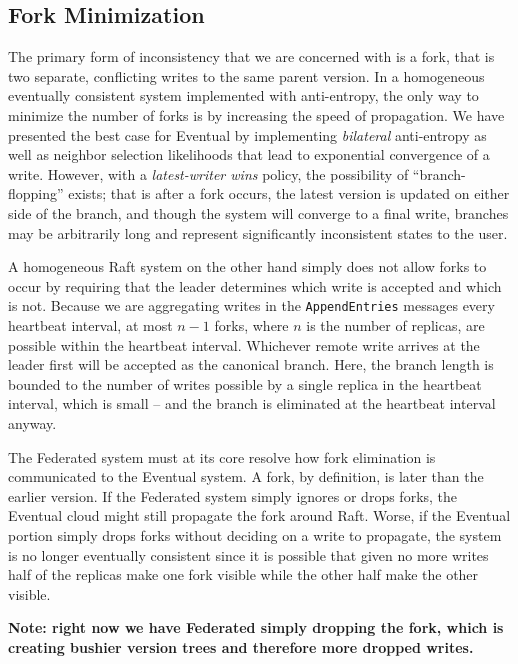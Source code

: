 \documentclass[10pt,conference,letterpaper]{IEEEtran}
\newcommand{\note}[1]{\textcolor{blue}{[#1]}}
\begin{document}

\subsection{Fork Minimization}

The primary form of inconsistency that we are concerned with is a fork, that is two separate, conflicting writes to the same parent version. In a homogeneous eventually consistent system implemented with anti-entropy, the only way to minimize the number of forks is by increasing the speed of propagation. We have presented the best case for Eventual by implementing \textit{bilateral} anti-entropy as well as neighbor selection likelihoods that lead to exponential convergence of a write. However, with a \textit{latest-writer wins} policy, the possibility of ``branch-flopping'' exists; that is after a fork occurs, the latest version is updated on either side of the branch, and though the system will converge to a final write, branches may be arbitrarily long and represent significantly inconsistent states to the user.

A homogeneous Raft system on the other hand simply does not allow forks to occur by requiring that the leader determines which write is accepted and which is not. Because we are aggregating writes in the \texttt{AppendEntries} messages every heartbeat interval, at most $n-1$ forks, where $n$ is the number of replicas, are possible within the heartbeat interval. Whichever remote write arrives at the leader first will be accepted as the canonical branch. Here, the branch length is bounded to the number of writes possible by a single replica in the heartbeat interval, which is small -- and the branch is eliminated at the heartbeat interval anyway.

The Federated system must at its core resolve how fork elimination is communicated to the Eventual system. A fork, by definition, is later than the earlier version. If the Federated system simply ignores or drops forks, the Eventual cloud might still propagate the fork around Raft. Worse, if the Eventual portion simply drops forks without deciding on a write to propagate, the system is no longer eventually consistent since it is possible that given no more writes half of the replicas make one fork visible while the other half make the other visible.

\textbf{Note: right now we have Federated simply dropping the fork, which is creating bushier version trees and therefore more dropped writes.}
\end{document}

